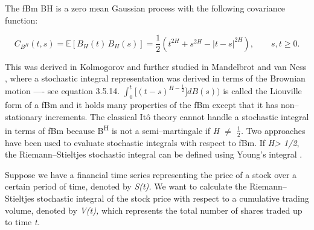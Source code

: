 \documentclass[12pt,a4paper]{report}
\numberwithin{equation}{section}
\begin{document}
The fBm BH is a zero mean Gaussian process with the following
covariance function:

\begin{equation}\label{eq:5.1.1}
C_{B^{H}}(t,s)
=\mathbb{E}\!\left[B_{H}(t)\,B_{H}(s)\right]
=\frac{1}{2}\left(t^{2H}+s^{2H}-|t-s|^{2H}\right), \qquad s,t\ge 0.
\end{equation}

This was derived in Kolmogorov \cite{kolmogorov1940wienersche_76} and further studied in
Mandelbrot and van Ness \cite{ness1968fractional_4}, where a stochastic integral
representation was derived in terms of the Brownian motion ---- see
equation 3.5.14. \(\int_{0}^{t}{\lbrack(t - s)^{H - \frac{1}{2}}\rbrack dB(s))}\) is
called the Liouville form of a fBm and it holds many properties of the
fBm except that it has non--stationary increments. The classical Itô
theory cannot handle a stochastic integral in terms of fBm because
B\textsuperscript{H} is not a semi--martingale if \emph{H $\neq$ $\frac{1}{2}$.} Two
approaches have been used to evaluate stochastic integrals with respect
to fBm. If \emph{H\textgreater{} 1/2}, the Riemann--Stieltjes stochastic
integral can be defined using Young's integral \cite{young1936inequality_77}.

Suppose we have a financial time series representing the price of a
stock over a certain period of time, denoted by \emph{S(t).} We want to
calculate the Riemann--Stieltjes stochastic integral of the stock price
with respect to a cumulative trading volume, denoted by \emph{V(t),}
which represents the total number of shares traded up to time \emph{t.}
\end{document}

